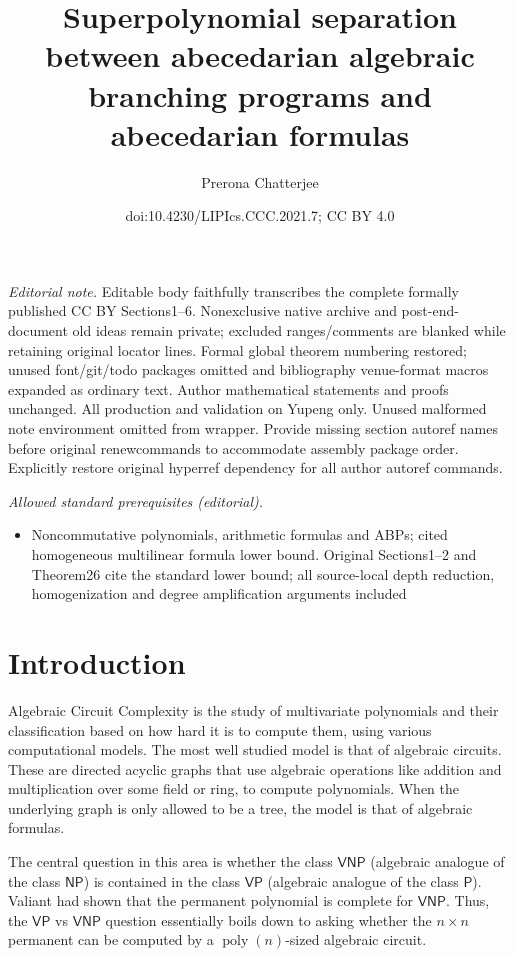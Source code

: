 \documentclass[10pt,a4paper]{article}
\title{Superpolynomial separation between abecedarian algebraic branching programs and abecedarian formulas}
\author{Prerona Chatterjee}
\date{doi:10.4230/LIPIcs.CCC.2021.7; CC BY 4.0}
\def\poly{\operatorname{poly}}
\def\VP{\mathsf{VP}}
\def\VNP{\mathsf{VNP}}
\def\P{\mathsf{P}}
\def\NP{\mathsf{NP}}
\begin{document}
\maketitle
\noindent\textit{Editorial note.} Editable body faithfully transcribes the complete formally published CC BY Sections1–6. Nonexclusive native archive and post-end-document old ideas remain private; excluded ranges/comments are blanked while retaining original locator lines. Formal global theorem numbering restored; unused font/git/todo packages omitted and bibliography venue-format macros expanded as ordinary text. Author mathematical statements and proofs unchanged. All production and validation on Yupeng only. Unused malformed note environment omitted from wrapper. Provide missing section autoref names before original renewcommands to accommodate assembly package order. Explicitly restore original hyperref dependency for all author autoref commands.\par\medskip
\noindent\textit{Allowed standard prerequisites (editorial).}\begin{itemize}
\item Noncommutative polynomials, arithmetic formulas and ABPs; cited homogeneous multilinear formula lower bound. Original Sections1–2 and Theorem26 cite the standard lower bound; all source-local depth reduction, homogenization and degree amplification arguments included
\end{itemize}\medskip
\section{Introduction}
Algebraic Circuit Complexity is the study of multivariate polynomials and their classification based on how hard it is to compute them, using various computational models. 
The most well studied model is that of algebraic circuits. 
These are directed acyclic graphs that use algebraic operations like addition and multiplication over some field or ring, to compute polynomials. 
When the underlying graph is only allowed to be a tree, the model is that of algebraic formulas.

The central question in this area is whether the class $\VNP$ (algebraic analogue of the class $\NP$) is contained in the class $\VP$ (algebraic analogue of the class $\P$).
Valiant \cite{V79} had shown that the permanent polynomial is complete for $\VNP$.
Thus, the $\VP$ vs $\VNP$ question essentially boils down to asking whether the $n \times n$ permanent can be computed by a $\poly(n)$-sized algebraic circuit.
\end{document}
